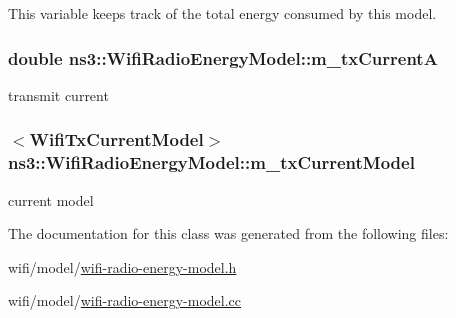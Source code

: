 This variable keeps track of the total energy consumed by this model. 

\subsubsection[{\texorpdfstring{m\+\_\+tx\+CurrentA}{m_txCurrentA}}]{\setlength{\rightskip}{0pt plus 5cm}double ns3\+::\+Wifi\+Radio\+Energy\+Model\+::m\+\_\+tx\+CurrentA\hspace{0.3cm}{\ttfamily [private]}}\hypertarget{classns3_1_1WifiRadioEnergyModel_a7875a6969770435f031014f41725dea5}{}\label{classns3_1_1WifiRadioEnergyModel_a7875a6969770435f031014f41725dea5}


transmit current 

\subsubsection[{\texorpdfstring{m\+\_\+tx\+Current\+Model}{m_txCurrentModel}}]{$<${\bf Wifi\+Tx\+Current\+Model}$>$ ns3\+::\+Wifi\+Radio\+Energy\+Model\+::m\+\_\+tx\+Current\+Model\hspace{0.3cm}{\ttfamily [private]}}\hypertarget{classns3_1_1WifiRadioEnergyModel_addde3c71494589b051fc5e23ff8c6aa9}{}\label{classns3_1_1WifiRadioEnergyModel_addde3c71494589b051fc5e23ff8c6aa9}


current model 



The documentation for this class was generated from the following files\+:\begin{DoxyCompactItemize}
\item 
wifi/model/\hyperlink{wifi-radio-energy-model_8h}{wifi-\/radio-\/energy-\/model.\+h}\item 
wifi/model/\hyperlink{wifi-radio-energy-model_8cc}{wifi-\/radio-\/energy-\/model.\+cc}\end{DoxyCompactItemize}
